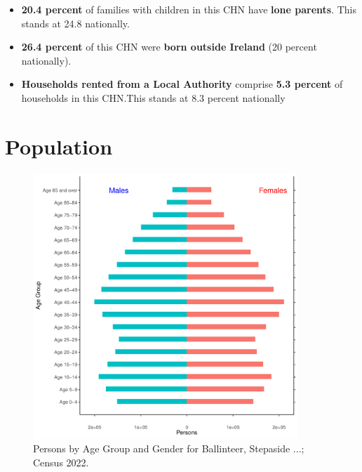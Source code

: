 \documentclass{article}
\begin{document}
\begin{itemize}
\item \textbf{20.4 percent} of families with children in this CHN have \textbf{lone parents}. This stands at 24.8 nationally.

\item \textbf{26.4 percent} of this CHN were \textbf{born outside Ireland} (20 percent nationally).

\item \textbf{Households rented from a Local Authority} comprise \textbf{5.3 percent} of households in this CHN.This stands at 8.3 percent nationally

\end{itemize}

\pagebreak

\section{Population} 
\label{sect:Pop}

\begin{figure}[h]
	\centering
	\includegraphics[width = 100mm]{../figures/PyramidPlot.pdf}
	\caption{Persons by Age Group and Gender for Ballinteer, Stepaside ...; Census 2022.}
	\label{fig:2ae19629-1a6a-13a3-e055-000000000001}
	\end{figure}
\end{document}
